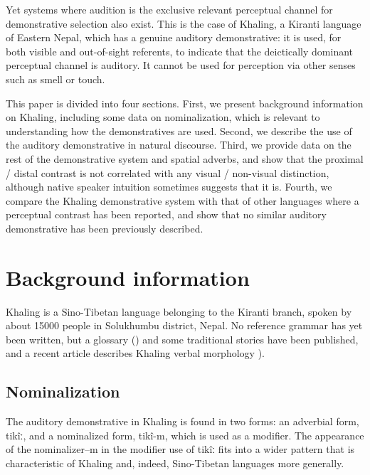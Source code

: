 \documentclass[oldfontcommands,oneside,a4paper,11pt]{article}
\newcommand{\ipa}[1]{{\phon \mbox{#1}}} %
\begin{document}




Yet systems where audition is the exclusive relevant perceptual channel for demonstrative selection also exist.  This is the case of Khaling, a Kiranti language of Eastern Nepal, which has a genuine auditory demonstrative: it is used, for both visible and out-of-sight referents, to indicate that the deictically dominant perceptual channel is auditory.  It cannot be used for perception via other senses such as smell or touch.  

This paper is divided into four sections. First, we present background information on Khaling, including some data on nominalization, which is relevant to understanding how the demonstratives are used. Second, we describe the use of the auditory demonstrative in natural discourse. Third, we provide data on the rest of the demonstrative system and spatial adverbs, and show that the proximal / distal contrast is not correlated with any visual / non-visual distinction, although native speaker intuition sometimes suggests that it is. Fourth, we compare the Khaling demonstrative system with that of   other languages where a perceptual contrast has been reported, and show that no similar auditory demonstrative has been previously described.

 


 
 \section{Background information}
 Khaling is a  Sino-Tibetan language belonging to the Kiranti branch, spoken by about 15000 people in Solukhumbu district, Nepal. No reference grammar has yet been written, but a  glossary (\citealt{toba75glossary}) and some traditional stories have been published, and a recent article describes Khaling verbal morphology \citealt{jacques12khaling}). 
 

 \subsection{Nominalization}
The auditory demonstrative in Khaling is found in two forms: an adverbial form, \ipa{tikîː}, and a nominalized form, \ipa{tikî-m}, which is used as a modifier. The appearance of the nominalizer\ipa{–m}  in the modifier use of \ipa{tikîː} fits into a wider pattern that is characteristic of Khaling and, indeed, Sino-Tibetan languages more generally.
\end{document}
